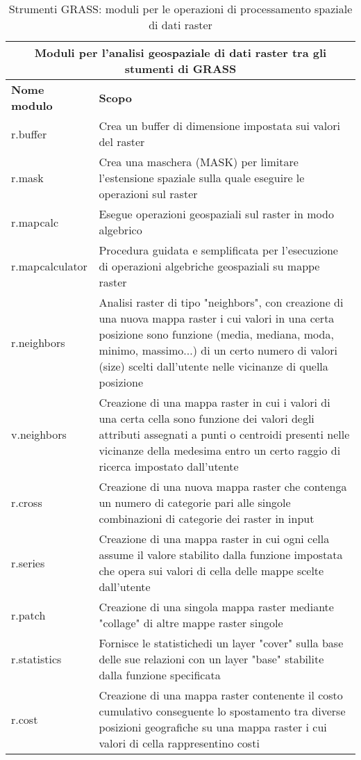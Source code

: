 \begin{table}[ht]
\centering
\caption{Strumenti GRASS: moduli per le operazioni di processamento spaziale di dati raster}\medskip
 \begin{tabular}{|p{4cm}|p{12cm}|}
  \hline \multicolumn{2}{|c|}{\textbf{Moduli per l'analisi geospaziale di dati raster tra gli stumenti di GRASS}} \\
  \hline \textbf{Nome modulo} & \textbf{Scopo} \\
  \hline r.buffer & Crea un buffer di dimensione impostata sui valori del raster \\
  \hline r.mask & Crea una maschera (MASK) per limitare l'estensione spaziale sulla quale eseguire le operazioni sul raster \\
  \hline r.mapcalc & Esegue operazioni geospaziali sul raster in modo algebrico \\
  \hline r.mapcalculator & Procedura guidata e semplificata per l'esecuzione di operazioni algebriche geospaziali su mappe raster \\
  \hline r.neighbors & Analisi raster di tipo "neighbors", con creazione di una nuova mappa raster i cui valori in una certa posizione sono funzione (media, mediana, moda, minimo, massimo...) di un certo numero di valori (size) scelti dall'utente nelle vicinanze di quella posizione \\
  \hline v.neighbors & Creazione di una mappa raster in cui i valori di una certa cella sono funzione dei valori degli attributi assegnati a punti o centroidi presenti nelle vicinanze della medesima entro un certo raggio di ricerca impostato dall'utente \\
  \hline r.cross & Creazione di una nuova mappa raster che contenga un numero di categorie pari alle singole combinazioni di categorie dei raster in input \\
  \hline r.series & Creazione di una mappa raster in cui ogni cella assume il valore stabilito dalla funzione impostata che opera sui valori di cella delle mappe scelte dall'utente \\
  \hline r.patch & Creazione di una singola mappa raster mediante "collage" di altre mappe raster singole \\
  \hline r.statistics & Fornisce le statistichedi un layer "cover" sulla base delle sue relazioni con un layer "base" stabilite dalla funzione specificata \\
  \hline r.cost & Creazione di una mappa raster contenente il costo cumulativo conseguente lo spostamento tra diverse posizioni geografiche su una mappa raster i cui valori di cella rappresentino costi \\

\end{tabular}
\end{table}
